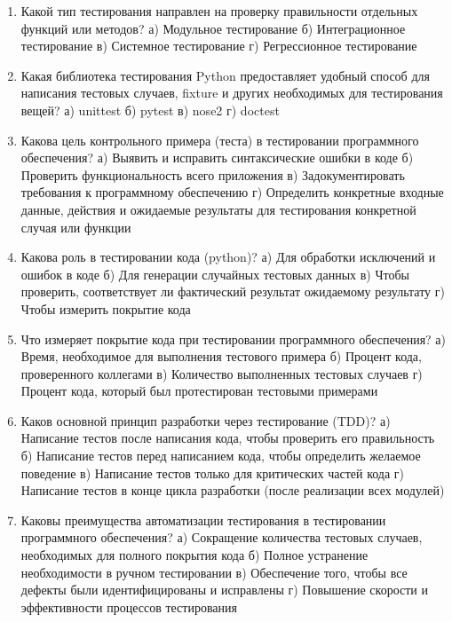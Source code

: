 \documentclass[letterpaper,10pt,russian]{sphinxmanual}
\begin{document}
\label{\detokenize{educational_materials/testing/quiz:id1}}\label{\detokenize{educational_materials/testing/quiz::doc}}\begin{enumerate}
%
\item {} 
\sphinxAtStartPar
Какой тип тестирования направлен на проверку правильности отдельных функций или методов?
а) Модульное тестирование
б) Интеграционное тестирование
в) Системное тестирование
г) Регрессионное тестирование

\item {} 
\sphinxAtStartPar
Какая библиотека тестирования Python предоставляет удобный способ для написания тестовых случаев, fixture и других необходимых для тестирования вещей?
а) unittest
б) pytest
в) nose2
г) doctest

\item {} 
\sphinxAtStartPar
Какова цель контрольного примера (теста) в тестировании программного обеспечения?
а) Выявить и исправить синтаксические ошибки в коде
б) Проверить функциональность всего приложения
в) Задокументировать требования к программному обеспечению
г) Определить конкретные входные данные, действия и ожидаемые результаты для тестирования конкретной случая или функции

\item {} 
\sphinxAtStartPar
Какова роль  в тестировании кода (python)?
а) Для обработки исключений и ошибок в коде
б) Для генерации случайных тестовых данных
в) Чтобы проверить, соответствует ли фактический результат ожидаемому результату
г) Чтобы измерить покрытие кода

\item {} 
\sphinxAtStartPar
Что измеряет покрытие кода при тестировании программного обеспечения?
а) Время, необходимое для выполнения тестового примера
б) Процент кода, проверенного коллегами
в) Количество выполненных тестовых случаев
г) Процент кода, который был протестирован тестовыми примерами

\item {} 
\sphinxAtStartPar
Каков основной принцип разработки через тестирование (TDD)?
а) Написание тестов после написания кода, чтобы проверить его правильность
б) Написание тестов перед написанием кода, чтобы определить желаемое поведение
в) Написание тестов только для критических частей кода
г) Написание тестов в конце цикла разработки (после реализации всех модулей)

\item {} 
\sphinxAtStartPar
Каковы преимущества автоматизации тестирования в тестировании программного обеспечения?
а) Сокращение количества тестовых случаев, необходимых для полного покрытия кода
б) Полное устранение необходимости в ручном тестировании
в) Обеспечение того, чтобы все дефекты были идентифицированы и исправлены
г) Повышение скорости и эффективности процессов тестирования


\end{enumerate}
\end{document}

